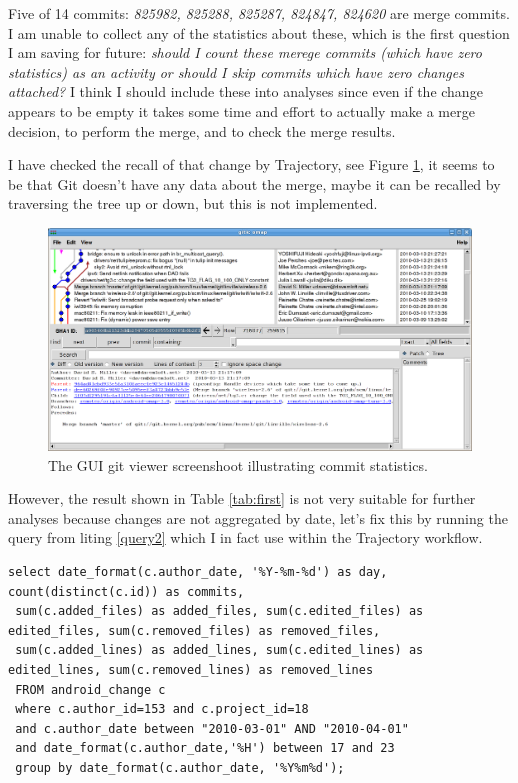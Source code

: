 \documentclass[a4paper,10pt]{article}
\numberwithin{equation}{subsection}
\begin{document}
 Five of 14 commits: \emph{825982, 825288, 825287, 824847, 824620} are merge commits. 
I am unable to collect any of the statistics about these, which is the first question I am saving for future: 
\textit{should I count these merege commits (which have zero statistics) as an activity or should I skip commits which have
zero changes attached?} I think I should include these into analyses since even if the change appears to be empty
it takes some time and effort to actually make a merge decision, to perform the merge, and to check the merge results.

I have checked the recall of that change by Trajectory, see Figure \ref{fig:git_screen}, it seems to be that Git doesn't have any 
data about the merge, maybe it can be recalled by traversing the tree up or down, but this is not implemented.

\begin{figure}
   \begin{center}
   \includegraphics[scale=1.0,width=1.0\textwidth]{figures/Screenshot-gitk:omap.png}
   \end{center}
   \caption{The GUI git viewer screenshoot illustrating commit statistics.}
   \label{fig:git_screen}
\end{figure}

\clearpage
However, the result shown in Table \ref{tab:first} is not very suitable for further analyses because changes are 
not aggregated by date, let's fix this by running the query from liting \ref{query2} which I in fact use within the 
Trajectory workflow.
\begin{lstlisting}[label=query2,caption=Data summary retrieval SQL query with aggergation by date]
select date_format(c.author_date, '%Y-%m-%d') as day, count(distinct(c.id)) as commits, 
 sum(c.added_files) as added_files, sum(c.edited_files) as edited_files, sum(c.removed_files) as removed_files, 
 sum(c.added_lines) as added_lines, sum(c.edited_lines) as edited_lines, sum(c.removed_lines) as removed_lines 
 FROM android_change c 
 where c.author_id=153 and c.project_id=18 
 and c.author_date between "2010-03-01" AND "2010-04-01"
 and date_format(c.author_date,'%H') between 17 and 23 
 group by date_format(c.author_date, '%Y%m%d');
\end{lstlisting}
\end{document}
